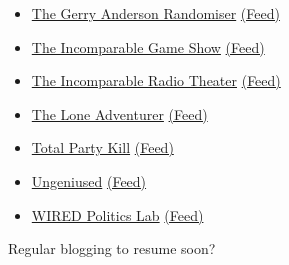 \begin{itemize}
\item
  \href{https://gerry-anderson-randomiser.captivate.fm/}{The Gerry
  Anderson Randomiser}
  \href{https://feeds.captivate.fm/gerry-anderson-randomiser/}{(Feed)}
\item
  \href{https://www.theincomparable.com/gameshow/}{The Incomparable Game
  Show} \href{https://feeds.theincomparable.com/gameshow}{(Feed)}
\item
  \href{https://www.theincomparable.com/radio/}{The Incomparable Radio
  Theater} \href{https://feeds.theincomparable.com/radio}{(Feed)}
\item
  \href{https://theloneadventurer.podbean.com/}{The Lone Adventurer}
  \href{https://feed.podbean.com/theloneadventurer/feed.xml}{(Feed)}
\item
  \href{https://www.theincomparable.com/tpk/}{Total Party Kill}
  \href{https://feeds.theincomparable.com/tpk}{(Feed)}
\item
  \href{https://www.relay.fm/ungeniused}{Ungeniused}
  \href{https://www.relay.fm/ungeniused/feed}{(Feed)}
\item
  \href{https://www.wired.com/}{WIRED Politics Lab}
  \href{https://publicfeeds.net/f/5802/have-a-nice-future}{(Feed)}
\end{itemize}

Regular blogging to resume soon?

